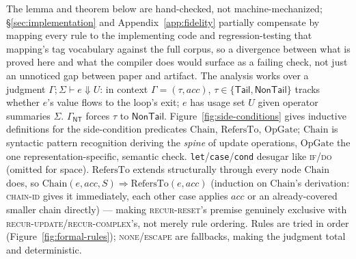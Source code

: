 \documentclass[sigplan,review,anonymous]{acmart}
\begin{document}
The lemma and theorem below are hand-checked, not machine-mechanized; §\ref{sec:implementation} and Appendix~\ref{app:fidelity} partially compensate by mapping every rule to the implementing code and regression-testing that mapping's tag vocabulary against the full corpus, so a divergence between what is proved here and what the compiler does would surface as a failing check, not just an unnoticed gap between paper and artifact. The analysis works over a judgment $\Gamma; \Sigma \vdash e \Downarrow U$: in context $\Gamma = (\tau, acc)$, $\tau \in \{\mathsf{Tail}, \mathsf{NonTail}\}$ tracks whether $e$'s value flows to the loop's exit; $e$ has usage set $U$ given operator summaries $\Sigma$. $\Gamma_{\mathsf{NT}}$ forces $\tau$ to $\mathsf{NonTail}$. Figure~\ref{fig:side-conditions} gives inductive definitions for the side-condition predicates $\mathrm{Chain}$, $\mathrm{RefersTo}$, $\mathrm{OpGate}$; $\mathrm{Chain}$ is syntactic pattern recognition deriving the \emph{spine} of update operations, $\mathrm{OpGate}$ the one representation-specific, semantic check. \texttt{let}/\texttt{case}/\texttt{cond} desugar like \textsc{if}/\textsc{do} (omitted for space). $\mathrm{RefersTo}$ extends structurally through every node $\mathrm{Chain}$ does, so $\mathrm{Chain}(e,acc,S) \Rightarrow \mathrm{RefersTo}(e,acc)$ (induction on $\mathrm{Chain}$'s derivation: \textsc{chain-id} gives it immediately, each other case applies $acc$ or an already-covered smaller chain directly) --- making \textsc{recur-reset}'s premise genuinely exclusive with \textsc{recur-update}/\textsc{recur-complex}'s, not merely rule ordering. Rules are tried in order (Figure~\ref{fig:formal-rules}); \textsc{none}/\textsc{escape} are fallbacks, making the judgment total and deterministic.
\end{document}
